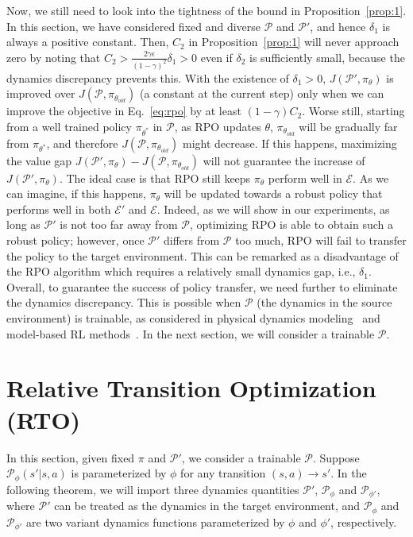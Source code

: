 \documentclass[letterpaper]{article} %
\def\P{{\mathcal{P}}}
\begin{document}
Now, we still need to look into the tightness of the bound in Proposition~\ref{prop:1}. In this section, we have considered fixed and diverse $\P$ and $\P'$, and hence $\delta_1$ is always a positive constant. Then, $C_2$ in Proposition~\ref{prop:1} will never approach zero by noting that $C_2>\frac{2\gamma\epsilon}{(1-\gamma)^2}\delta_1>0$ even if $\delta_2$ is sufficiently small, because the dynamics discrepancy prevents this. With the existence of $\delta_1>0$, $J(\P',\pi_{\theta})$ is improved over $J(\P,\pi_{\theta_{old}})$ (a constant at the current step) only when we can improve the objective in Eq.~\eqref{eq:rpo} by at least $(1-\gamma)C_2$.
Worse still, starting from a well trained policy $\pi_{\theta^*}$ in $\P$, as RPO updates $\theta$, $\pi_{\theta_{old}}$ will be gradually far from $\pi_{\theta^*}$, and therefore $J(\P,\pi_{\theta_{old}})$ might decrease. If this happens, maximizing the value gap $J(\P',\pi_{\theta})-J(\P,\pi_{\theta_{old}})$ will not guarantee the increase of $J(\P',\pi_{\theta})$. 
The ideal case is that RPO still keeps $\pi_{\theta}$ perform well in $\mathcal{E}$. 
As we can imagine, if this happens, $\pi_{\theta}$ will be updated towards a robust policy that performs well in both $\mathcal{E}'$ and $\mathcal{E}$. 
Indeed, as we will show in our experiments, as long as $\P'$ is not too far away from $\P$, optimizing RPO is able to obtain such a robust policy; however, once $\P'$ differs from $\P$ too much, RPO will fail to transfer the policy to the target environment. This can be remarked as a disadvantage of the RPO algorithm which requires a relatively small dynamics gap, i.e., $\delta_1$.
Overall, to guarantee the success of policy transfer, we need further to eliminate the dynamics discrepancy. 
This is possible when $\P$ (the dynamics in the source environment) is trainable, as considered in physical dynamics modeling~\citep{hu2020difftaichi,brax2021github,werling2021fast} and model-based RL methods~\citep{janner2019trust}. In the next section, we will consider a trainable $\P$.



\section{Relative Transition Optimization (RTO)}
\label{sec:rto}
In this section, given fixed $\pi$ and $\P'$, we consider a trainable $\P$. Suppose $\P_{\phi}(s'|s,a)$ is parameterized by $\phi$ for any transition $(s,a)\xrightarrow{}s'$. In the following theorem, we will import three dynamics quantities $\P'$, $\P_{\phi}$ and $\P_{\phi'}$, where $\P'$ can be treated as the dynamics in the target environment, and $\P_{\phi}$ and $\P_{\phi'}$ are two variant dynamics functions parameterized by $\phi$ and $\phi'$, respectively.
\end{document}
